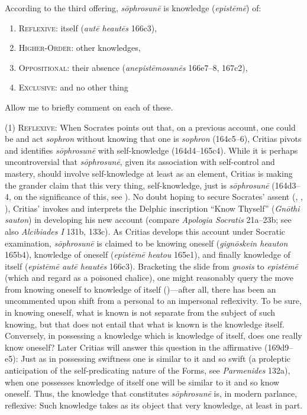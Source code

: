 According to the third offering, \emph{sōphrosunē} is knowledge (\emph{epistēmē}) of:
\begin{enumerate}[(1)]
	\item \textsc{Reflexive}: itself (\emph{autē heautēs} 166c3),
	\item \textsc{Higher-Order}: other knowledges,
	\item \textsc{Oppositional}: their absence (\emph{anepistēmosunēs} 166e7–8, 167c2),
	\item \textsc{Exclusive}: and no other thing
\end{enumerate}

Allow me to briefly comment on each of these.

(1) \textsc{Reflexive}: When Socrates points out that, on a previous account, one could be and act \emph{sophron} without knowing that one is \emph{sophron} (164c5–6), Critias pivots and identifies \emph{sōphrosunē} with self-knowledge (164d4–165c4). While it is perhaps uncontroversial that \emph{sōphrosunē}, given its association with self-control and mastery, should involve self-knowledge at least as an element, Critias is making the grander claim that this very thing, self-knowledge, just is \emph{sōphrosunē} (164d3–4, on the significance of this, see \citealt{Kosman:2014aa}). No doubt hoping to secure Socrates' assent (\citealt[23–4]{Tuckey:1951aa}, \citealt[81]{Hyland:1981aa}, \citealt[161–2]{Tsouna:2022aa}), Critias' invokes and interprets the Delphic inscription ``Know Thyself'' (\emph{Gnōthi sauton}) in developing his new account (compare \emph{Apologia Socratis} 21a–23b; see also \emph{Alcibiades I} 131b, 133c). As Critias develops this account under Socratic examination, \emph{sōphrosunē} is claimed to be knowing oneself (\emph{gignōskein heauton} 165b4), knowledge of oneself (\emph{epistēmē heatou} 165e1), and finally knowledge of itself (\emph{epistēmē autē heautēs} 166c3). Bracketing the slide from \emph{gnosis} to \emph{epistēmē} (which \citealt{Hyland:1981aa} and \citealt{Schmid:1998aa} regard as a poisoned chalice), one might reasonably query the move from knowing oneself to knowledge of itself (\citealt[33–7, 107–8]{Tuckey:1951aa})—after all, there has been an uncommented upon shift from a personal to an impersonal reflexivity. To be sure, in knowing oneself, what is known is not separate from the subject of such knowing, but that does not entail that what is known is the knowledge itself. Conversely, in possessing a knowledge which is knowledge of itself, does one really know oneself? Later Critias will answer this question in the affirmative (169d9–e5): Just as in possessing swiftness one is similar to it and so swift (a proleptic anticipation of the self-predicating nature of the Forms, see \emph{Parmenides} 132a), when one possesses knowledge of itself one will be similar to it and so know oneself. Thus, the knowledge that constitutes \emph{sōphrosunē} is, in modern parlance, reflexive: Such knowledge takes as its object that very knowledge, at least in part.

